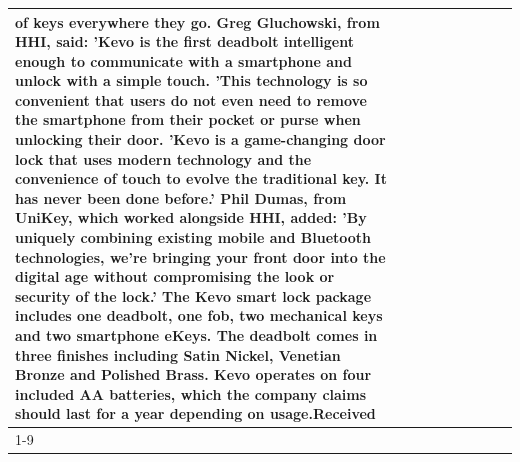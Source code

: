 \begin{table}[H]
\begin{tabular}{lllrlllll}
of keys everywhere they go. Greg Gluchowski, from HHI, said: 'Kevo is the first deadbolt intelligent enough to communicate with a smartphone and unlock with a simple touch. 'This technology is so convenient that users do not even need to remove the smartphone from their pocket or purse when unlocking their door. 'Kevo is a game-changing door lock that uses modern technology and the convenience of touch to evolve the traditional key. It has never been done before.' Phil Dumas, from UniKey, which worked alongside HHI, added: 'By uniquely combining existing mobile and Bluetooth technologies, we’re bringing your front door into the digital age without compromising the look or security of the lock.' The Kevo smart lock package includes one deadbolt, one fob, two mechanical keys and two smartphone eKeys. The deadbolt comes in three finishes including Satin Nickel, Venetian Bronze and Polished Brass. Kevo operates on four included AA batteries, which the company claims should last for a year depending on usage.Received \\
\cline{1-9}

\end{tabular}
\end{table}
